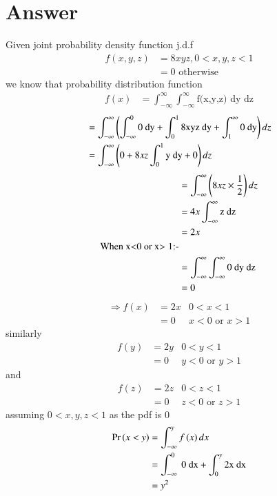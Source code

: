 \documentclass[journal,12pt,twocolumn]{IEEEtran}
\begin{document}
\section{Answer}
Given joint probability density function j.d.f 
\begin{align}
    f(x,y,z)&=8xyz, 0<x,y,z<1 \nonumber \\
    &=0 \text{ otherwise}
\end{align}
we know that probability distribution function 
\begin{align}
    f(x)&=\int _{-\infty}^{\infty}\int _{-\infty}^{\infty} \text{f(x,y,z) dy dz} 
\end{align}
\begin{align}
    & =\int _{-\infty}^{\infty}\left(\int _{-\infty}^{0}\text{0 dy} + \int _0 ^1 \text{8xyz dy} +\int _{1}^{\infty}\text{0 dy}\right) dz \\
    &=\int _{-\infty}^{\infty}\left(0 + 8xz \int _{0}^{1} \text{y dy} + 0\right)dz \nonumber
\end{align}
\begin{align}
    &=\int _{-\infty}^{\infty}\left(8xz \times \frac{1}{2}\right) dz \nonumber \\
    &=4x\int _{-\infty}^{\infty}\text{z dz} \nonumber\\
    &=2x\\
\text{When x$<$0 or x$>1$:-} \nonumber \\
    &= \int _{-\infty}^{\infty}\int _{-\infty}^{\infty} \text{0 dy dz}\\
    &=0\\
\end{align}
\begin{align}
    \Rightarrow f(x)&=2x &\text{0$<x<1$} \nonumber\\
    &=0 &x<0\text{ or }x>1
\end{align}
similarly 
\begin{align}
f(y)&=2y  &\text{0$<y<1$} \nonumber\\
    &=0 &y<0\text{ or }y>1
\end{align}
and 
\begin{align}
f(z)&=2z  &\text{0$<z<1$} \nonumber\\
    &=0 &z<0\text{ or }z>1
\end{align}
assuming $0<x,y,z<1$ as the pdf is 0 
\begin{align}
\Pr\left(x<y\right)&=\int _{-\infty}^y f\left(x\right) dx\\
&=\int _{-\infty} ^0 \text{ 0 dx} +\int _0^y \text{2x dx}\\
&=y^2
\end{align}
\end{document}
